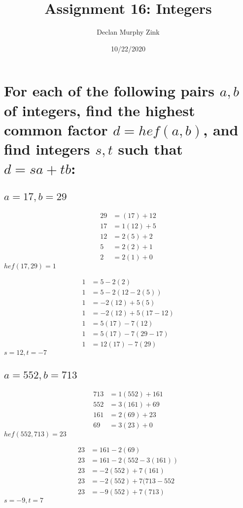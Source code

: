 \documentclass[12pt]{article}
\begin{document}
\title{Assignment 16: Integers}
\author{Declan Murphy Zink}
\date{10/22/2020}
\maketitle

\setcounter{section}{0}

\section{
    For each of the following pairs $a,b$ of integers, find the highest common factor $d = hef(a,b)$, and find integers $s,t$ such that $d=sa+tb$:
}
\subsection{$a = 17, b = 29$}
\begin{align*}
    29&=(17)+12\\
    17&=1(12)+5\\
    12&=2(5)+2\\
    5&=2(2)+1\\
    2&=2(1)+0
\end{align*}
$hef(17,29)=1$

\begin{align*}
    1&=5-2(2)\\
    1&=5-2(12-2(5))\\
    1&=-2(12)+5(5)\\
    1&=-2(12)+5(17-12)\\
    1&=5(17)-7(12)\\
    1&=5(17)-7(29-17)\\
    1&=12(17)-7(29)
\end{align*}
$s=12,t=-7$


\subsection{$a=552,b=713$}
\begin{align*}
    713&=1(552)+161\\
    552&=3(161)+69\\
    161&=2(69)+23\\
    69&=3(23)+0
\end{align*}
$hef(552,713)=23$

\begin{align*}
    23&=161-2(69)\\
    23&=161-2(552-3(161))\\
    23&=-2(552)+7(161)\\
    23&=-2(552)+7(713-552\\
    23&=-9(552)+7(713)
\end{align*}
$s=-9,t=7$
\end{document}
